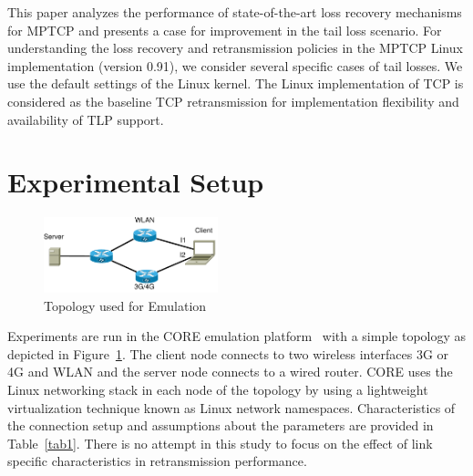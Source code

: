 \documentclass[10pt,conference]{IEEEtran}
\begin{document}
This paper analyzes the performance of state-of-the-art loss recovery mechanisms for MPTCP and presents a case for improvement in the tail loss 
scenario. For understanding the loss recovery and retransmission policies in the MPTCP Linux implementation (version 0.91), we consider several specific 
cases of tail losses. We use the default settings of the Linux kernel. The Linux implementation of TCP is considered as the baseline TCP 
retransmission for implementation flexibility and availability of TLP support.

\section{Experimental Setup}\label{exsetup}
\begin{figure}
\begin{center}
\includegraphics[angle=0, width=0.45\textwidth]{images/fortest.pdf}
\caption{Topology used for Emulation}\label{fig1}
\end{center}
\end{figure}

Experiments are run in the CORE emulation platform~\cite{CORE} with a simple topology as depicted in Figure~\ref{fig1}. The client node connects to two wireless interfaces 3G or 4G and WLAN and the server node connects to a wired router.
CORE uses the Linux networking stack in each node of the topology by using a lightweight virtualization technique known as Linux network namespaces.
Characteristics of the connection setup and assumptions about the parameters are provided in Table~\ref{tab1}.
There is no attempt in this study to focus on the effect of link specific characteristics in retransmission performance.
\end{document}
